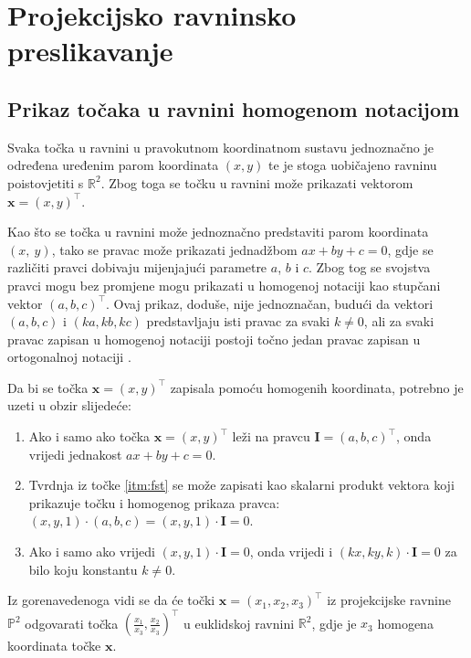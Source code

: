 \chapter{Projekcijsko ravninsko preslikavanje}
\label{ch:preslikavanje}

\section{Prikaz točaka u ravnini homogenom notacijom}
\label{sec:homNot}

Svaka točka u ravnini u pravokutnom koordinatnom sustavu jednoznačno je određena uređenim parom koordinata $(x, y)$ te je stoga uobičajeno ravninu poistovjetiti s $\mathbb{R}^2$. Zbog toga se točku u ravnini može prikazati vektorom $\mathbf{x} = (x, y)^\top$.

Kao što se točka u ravnini može jednoznačno predstaviti  parom koordinata $(x,~y)$, tako se pravac može prikazati jednadžbom $ax + by + c = 0$, gdje se različiti pravci dobivaju mijenjajući parametre $a$, $b$ i $c$. Zbog tog se svojstva pravci mogu bez promjene mogu prikazati u homogenoj notaciji kao stupčani vektor $(a, b, c)^\top$. Ovaj prikaz, doduše, nije jednoznačan, budući da vektori $(a, b, c)$ i $(ka, kb, kc)$ predstavljaju isti pravac za svaki $k \neq 0$, ali za svaki pravac zapisan u homogenoj notaciji postoji točno jedan pravac zapisan u ortogonalnoj notaciji \citep{Hartley2004}.

Da bi se točka $\mathbf{x} = (x, y)^\top$ zapisala pomoću homogenih koordinata, potrebno je uzeti u obzir slijedeće:
\begin{enumerate}
	\item \label{itm:fst} Ako i samo ako točka $\mathbf{x} = (x, y)^\top$ leži na pravcu $\mathbf{I} =(a, b, c)^\top$, onda vrijedi jednakost $ax + by + c = 0$.
	\item Tvrdnja iz točke \ref{itm:fst} se može zapisati kao skalarni produkt vektora koji prikazuje točku i homogenog prikaza pravca: $(x, y, 1) \cdot (a, b, c) = (x, y, 1) \cdot \mathbf{I} = 0$.
	\item Ako i samo ako vrijedi $(x, y, 1) \cdot \mathbf{I} = 0$, onda vrijedi i  $(kx, ky, k) \cdot \mathbf{I} = 0$ za bilo koju konstantu $k \neq 0$.
\end{enumerate}

Iz gorenavedenoga vidi se da će točki $\mathbf{x} = (x_1, x_2, x_3)^\top$ iz projekcijske ravnine $\mathbb{P}^2$ odgovarati točka $(\frac{x_1}{x_3}, \frac{x_2}{x_3})^\top$ u euklidskoj ravnini $\mathbb{R}^2$, gdje je $x_3$ homogena koordinata točke $\mathbf{x}$.


